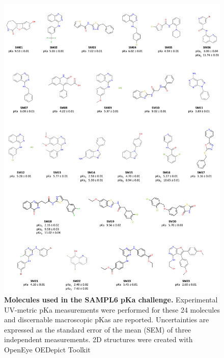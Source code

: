 \documentclass[9pt,lineno]{elife}
\begin{document}
\begin{figure}
\includegraphics[width=1.00\linewidth]{figures/SAMPL6_pKa_molecules_fig}
\caption{{\bf Molecules used in the SAMPL6 pKa challenge.} 
Experimental UV-metric pKa measurements were performed for these 24 molecules and discernable macroscopic pKas are reported. 
Uncertainties are expressed as the standard error of the mean (SEM) of three independent measurements. 
2D structures were created with OpenEye OEDepict Toolkit~\citep{oedepict_openeye_2017}
}
\label{fig:pKa_molecules}
\end{figure}
\end{document}
